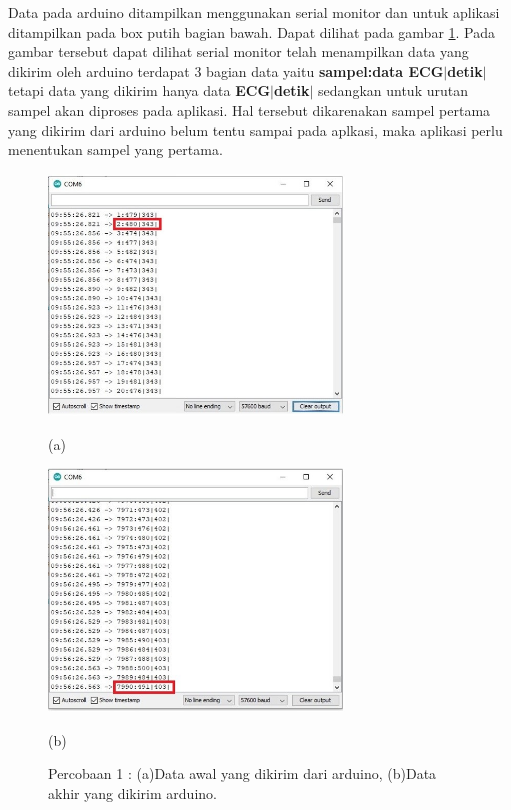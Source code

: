 Data pada arduino ditampilkan menggunakan serial monitor dan untuk aplikasi ditampilkan pada box putih bagian bawah. Dapat dilihat pada gambar \ref{fig:4.2}. Pada gambar tersebut dapat dilihat serial monitor telah menampilkan data yang dikirim oleh arduino terdapat 3 bagian data yaitu \textbf{sampel:data ECG$\mid$detik$\mid$} tetapi data yang dikirim hanya data \textbf{ECG$\mid$detik$\mid$} sedangkan untuk urutan sampel akan diproses pada aplikasi. Hal tersebut dikarenakan sampel pertama yang dikirim dari arduino belum tentu sampai pada aplkasi, maka aplikasi perlu menentukan sampel yang pertama. 
\begin{figure}[H] \centering
	\includegraphics[width=0.7\textwidth]{img/percob/Slide1}

	(a)
	
	\includegraphics[width=0.7\textwidth]{img/percob/Slide2}
	
	(b)
	
	\caption{Percobaan 1 : (a)Data awal yang dikirim dari arduino, (b)Data akhir yang dikirim arduino.}
	\label{fig:4.2}
\end{figure}
